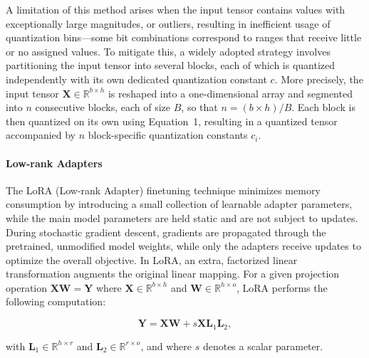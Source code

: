 A limitation of this method arises when the input tensor contains values with exceptionally large magnitudes, or outliers, resulting in inefficient usage of quantization bins—some bit combinations correspond to ranges that receive little or no assigned values. To mitigate this, a widely adopted strategy involves partitioning the input tensor into several blocks, each of which is quantized independently with its own dedicated quantization constant $c$. More precisely, the input tensor $\mathbf{X}\in \mathbb{R}^{b\times h}$ is reshaped into a one-dimensional array and segmented into $n$ consecutive blocks, each of size $B$, so that $n = ({b\times h})/{B}$. Each block is then quantized on its own using Equation~1, resulting in a quantized tensor accompanied by $n$ block-specific quantization constants $c_i$.

\paragraph{Low-rank Adapters} The LoRA (Low-rank Adapter) finetuning technique \citep{hu2021lora} minimizes memory consumption by introducing a small collection of learnable adapter parameters, while the main model parameters are held static and are not subject to updates. During stochastic gradient descent, gradients are propagated through the pretrained, unmodified model weights, while only the adapters receive updates to optimize the overall objective. In LoRA, an extra, factorized linear transformation augments the original linear mapping. For a given projection operation ${\mathbf{X} \mathbf{W} = \mathbf{Y}}$ where $\mathbf{X}\in  \mathbb{R}^{b\times h}$ and $\mathbf{W}\in  \mathbb{R}^{h\times o}$, LoRA performs the following computation:

\begin{equation}
    \mathbf{Y} = \mathbf{X}\mathbf{W} + s\mathbf{X}\mathbf{L}_1\mathbf{L}_2,
\end{equation}

with $\mathbf{L}_1\in  \mathbb{R}^{h\times r}$ and $\mathbf{L}_2\in  \mathbb{R}^{r\times o}$, and where $s$ denotes a scalar parameter.

